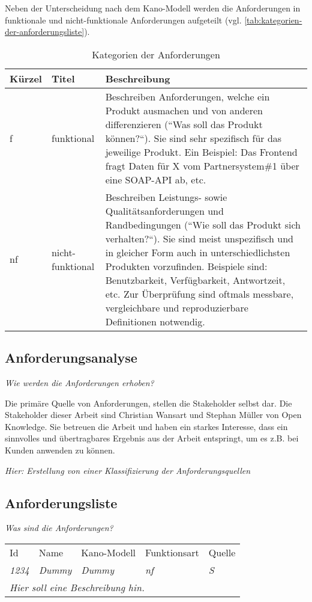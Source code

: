 Neben der Unterscheidung nach dem Kano-Modell werden die Anforderungen in funktionale und nicht-funktionale Anforderungen \cite{FunktionaleUndNichtFunktionaleAnforderungen} aufgeteilt (vgl. \autoref{tab:kategorien-der-anforderungsliste}).

\begin{table}[H]
\begin{tabular}{ |p{1.25cm}|p{3cm}|p{9.25cm}| }
	\hline
	Kürzel & Titel & Beschreibung \\
	\hline
	f & funktional & Beschreiben Anforderungen, welche ein Produkt ausmachen und von anderen differenzieren (``Was soll das Produkt können?{``}). Sie sind sehr spezifisch für das jeweilige Produkt. Ein Beispiel: Das Frontend fragt Daten für X vom Partnersystem\#1 über eine SOAP-API ab, etc.\\
	\hline
	nf & nicht-funktional & Beschreiben Leistungs- sowie Qualitätsanforderungen und Randbedingungen (``Wie soll das Produkt sich verhalten?{``}). Sie sind meist unspezifisch und in gleicher Form auch in unterschiedlichsten Produkten vorzufinden. Beispiele sind: Benutzbarkeit, Verfügbarkeit, Antwortzeit, etc. Zur Überprüfung sind oftmals messbare, vergleichbare und reproduzierbare Definitionen notwendig. \\
	\hline
\end{tabular}
 \captionsetup{justification=centering}
  \caption{Kategorien der Anforderungen}
   \label{tab:kategorien-der-anforderungsliste}
\end{table}
	
\subsection{Anforderungsanalyse}

\textit{Wie werden die Anforderungen erhoben?}

Die primäre Quelle von Anforderungen, stellen die Stakeholder selbst dar. Die Stakeholder dieser Arbeit sind Christian Wansart und Stephan Müller von Open Knowledge. Sie betreuen die Arbeit und haben ein starkes Interesse, dass ein sinnvolles und übertragbares Ergebnis aus der Arbeit entspringt, um es z.B. bei Kunden anwenden zu können.

\textit{{\color{red}Hier: Erstellung von einer Klassifizierung der Anforderungsquellen}}
	
\subsection{Anforderungsliste}

\textit{Was sind die Anforderungen?}

\begin{table}[H]
\begin{tabular}{ |p{1.25cm}|p{5.5cm}|p{2.25cm}|p{2.1cm}|p{1.25cm}| }
\hline
Id           & Name         & Kano-Modell  & Funktionsart & Quelle       \\
\textit{1234} & \textit{Dummy} & \textit{Dummy} & \textit{nf} & \textit{S} \\
\hline
\multicolumn{5}{|l|}{\textit{Hier soll eine Beschreibung hin.}} \\
\hline
\end{tabular}
\end{table}